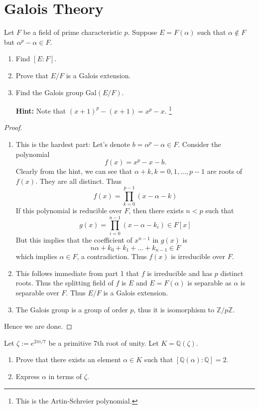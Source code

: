 \documentclass[11pt,letterpaper]{article}
\DeclareMathOperator{\1}{\mathbbm{1}}
\begin{document}
\section{Galois Theory}
\begin{exercise}\label{Galois theory }
  Let $F$ be a field of prime characteristic $p$. Suppose $E = F(\alpha)$ such that
  $\alpha \notin F$ but $\alpha^p -\alpha \in F$.
  \begin{enumerate}
    \item Find $[E:F]$.
    \item Prove that $E/F$ is a Galois extension.
    \item Find the Galois group $\text{Gal}(E/F)$.

          \textbf{Hint:} Note that $(x+1)^p -(x+1)=x^p -x$. \footnote{This is the Artin-Schreier polynomial.}

  \end{enumerate}
\end{exercise}
\begin{proof}
  \hfill \\
  \begin{enumerate}
    \item This is the hardest part: Let's denote $b=\alpha^p - \alpha \in F$. Consider the
          polynomial $$f(x) = x^p - x - b.$$
          Clearly from the hint, we can see that $\alpha+k, k = 0,1,\ldots,p-1$ are roots of $f(x)$. They are all distinct.
          Thus
          \[f(x) = \prod_{k=0}^{p-1}(x-\alpha-k)\]
          If this polynomial is reducible over $F$, then there exists $n < p$ such that
          \[g(x) = \prod_{i=0}^{n-1}(x-\alpha-k_i) \in F[x]\]
          But this implies that the coefficient of $x^{n-1}$ in $g(x)$ is
          \[n\alpha + k_0+k_1+\ldots+k_{n-1} \in F\]
          which implies $\alpha \in F$, a contradiction. Thus $f(x)$ is irreducible over $F$.
    \item This follows immediate from part 1 that $f$ is irreducible and has $p$ distinct roots. Thus the splitting field of $f$ is $E$ and $E=F(\alpha)$
          is separable as $\alpha$ is separable over $F$. Thus $E/F$ is a Galois extension.
    \item The Galois group is a group of order $p$, thus it is isomorphism to $\mathbb{Z}/p\mathbb{Z}$.
  \end{enumerate} Hence we are done.
\end{proof}
\begin{exercise}
  Let $\zeta := e^{2\pi i/7}$ be a primitive 7th root of unity. Let $K = \mathbb{Q}(\zeta)$.
  \begin{enumerate}
    \item Prove that there exists an element $\alpha \in K$ such that  $[\mathbb{Q}(\alpha):\mathbb{Q}] = 2$.
    \item Express $\alpha$ in terms of $\zeta$.
  \end{enumerate}
\end{exercise}
\end{document}
